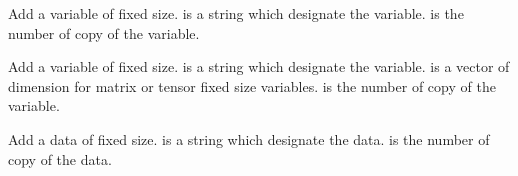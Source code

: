 \documentclass[a4paper,11pt,english]{sphinxmanual}
\begin{document}

\begin{fulllineitems}
\label{\detokenize{userdoc/model_object:_CPPv4N6getfem5model23add_fixed_size_variableE4name4size5niter}}%
\pysigstartmultiline
{}%
\pysigstopmultiline
Add a variable of fixed size.  is a string which designate the
variable.  is the number of copy of the variable.

\end{fulllineitems}


\begin{fulllineitems}
\label{\detokenize{userdoc/model_object:_CPPv4N6getfem5model23add_fixed_size_variableE4name5sizes5niter}}%
\pysigstartmultiline
{}%
\pysigstopmultiline
Add a variable of fixed size.  is a string which designate the
variable.  is a vector of dimension for matrix or tensor fixed
size variables.  is the number of copy of the variable.

\end{fulllineitems}


\begin{fulllineitems}
\label{\detokenize{userdoc/model_object:_CPPv4N6getfem5model19add_fixed_size_dataE4name4size5niter}}%
\pysigstartmultiline
{}%
\pysigstopmultiline
Add a data of fixed size.  is a string which designate the data.
 is the number of copy of the data.

\end{fulllineitems}
\end{document}
